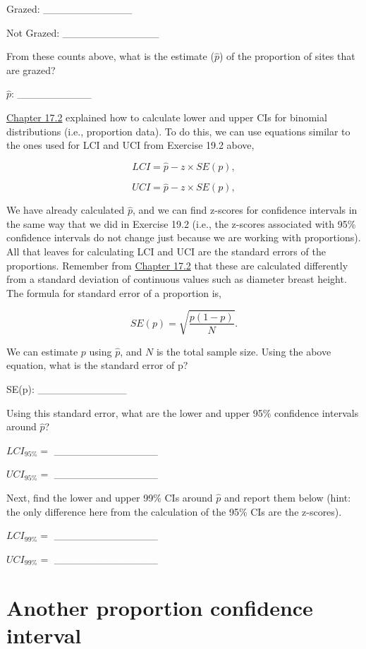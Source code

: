 \documentclass[
]{scrbook}
\begin{document}
Grazed: \_\_\_\_\_\_\_\_\_\_\_\_

Not Grazed: \_\_\_\_\_\_\_\_\_\_\_\_\_

From these counts above, what is the estimate (\(\hat{p}\)) of the proportion of sites that are grazed?

\(\hat{p}\): \_\_\_\_\_\_\_\_\_\_

\href{Chapter_17.html\#binomial-distribution-cis}{Chapter 17.2} explained how to calculate lower and upper CIs for binomial distributions (i.e., proportion data).
To do this, we can use equations similar to the ones used for LCI and UCI from Exercise 19.2 above,

\[LCI = \hat{p} - z \times SE(p),\]

\[UCI = \hat{p} - z \times SE(p),\]

We have already calculated \(\hat{p}\), and we can find z-scores for confidence intervals in the same way that we did in Exercise 19.2 (i.e., the z-scores associated with 95\% confidence intervals do not change just because we are working with proportions).
All that leaves for calculating LCI and UCI are the standard errors of the proportions.
Remember from \href{Chapter_17.html\#binomial-distribution-cis}{Chapter 17.2} that these are calculated differently from a standard deviation of continuous values such as diameter breast height.
The formula for standard error of a proportion is,

\[SE(p) = \sqrt{\frac{p\left(1 - p\right)}{N}}.\]

We can estimate \(p\) using \(\hat{p}\), and \(N\) is the total sample size.
Using the above equation, what is the standard error of p?

SE(p): \_\_\_\_\_\_\_\_\_\_\_\_

Using this standard error, what are the lower and upper 95\% confidence intervals around \(\hat{p}\)?

\(LCI_{95\%} =\) \_\_\_\_\_\_\_\_\_\_\_\_\_\_

\(UCI_{95\%} =\) \_\_\_\_\_\_\_\_\_\_\_\_\_\_

Next, find the lower and upper 99\% CIs around \(\hat{p}\) and report them below (hint: the only difference here from the calculation of the 95\% CIs are the z-scores).

\(LCI_{99\%} =\) \_\_\_\_\_\_\_\_\_\_\_\_\_\_

\(UCI_{99\%} =\) \_\_\_\_\_\_\_\_\_\_\_\_\_\_

\hypertarget{another-proportion-confidence-interval}{%
\section{Another proportion confidence interval}\label{another-proportion-confidence-interval}}
\end{document}
